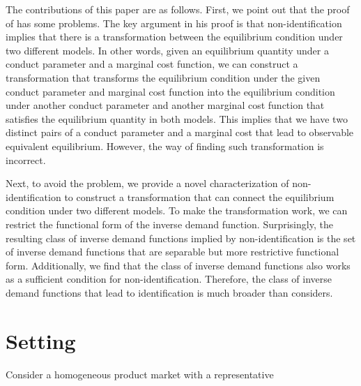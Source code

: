 \documentclass[11pt, a4paper]{article}
\theoremstyle{remark}
\begin{document}
The contributions of this paper are as follows. 
First, we point out that the proof of \citet{lau1982identifying} has some problems.
The key argument in his proof is that non-identification implies that there is a transformation between the equilibrium condition under two different models.
In other words, given an equilibrium quantity under a conduct parameter and a marginal cost function, we can construct a transformation that transforms the equilibrium condition under the given conduct parameter and marginal cost function into the equilibrium condition under another conduct parameter and another marginal cost function that satisfies the equilibrium quantity in both models.
This implies that we have two distinct pairs of a conduct parameter and a marginal cost that lead to observable equivalent equilibrium.
However, the way of finding such transformation is incorrect.

Next, to avoid the problem, we provide a novel characterization of non-identification to construct a transformation that can connect the equilibrium condition under two different models.
To make the transformation work, we can restrict the functional form of the inverse demand function.
Surprisingly, the resulting class of inverse demand functions implied by non-identification is the set of inverse demand functions that are separable but more restrictive functional form.
Additionally, we find that the class of inverse demand functions also works as a sufficient condition for non-identification.
Therefore, the class of inverse demand functions that lead to identification is much broader than \citet{lau1982identifying} considers.

\section{Setting}\label{sec:setting}
Consider a homogeneous product market with a representative 
\end{document}
